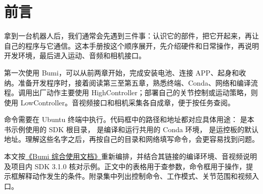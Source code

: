 \chapter*{前言}
拿到一台机器人后，我们通常会先遇到三件事：认识它的部件，把它开起来，再让自己的程序与它通信。这本手册按这个顺序展开，先介绍硬件和日常操作，再说明开发环境，最后进入运动、音频和相机接口。

第一次使用 Bumi，可以从前两章开始，完成安装电池、连接 APP、起身和收纳。准备开发程序时，接着阅读第三至第五章，熟悉终端、Conda、网络和编译流程。调用出厂动作主要使用 HighController；部署自己的关节控制或运动策略，则使用 LowController。音视频接口和相机采集各自成章，便于按任务查阅。

命令需要在 Ubuntu 终端中执行。代码框中的路径和地址都对应具体用途： 是本书示例使用的 SDK 根目录， 是编译和运行共用的 Conda 环境， 是运控板的默认地址。理解这些名字之后，再按自己的目录和网络填写命令，会更容易找到问题。

本文按\href{https://noetixrobotics.feishu.cn/docx/As2adPO27odPBfxQw1ucK6N4nNe}{《Bumi 综合使用文档》}重新编排，并结合其链接的编译环境、音视频说明及项目内 SDK 3.1.0 核对示例。正文中的表格用于查参数，命令框用于操作，提示框解释动作发生的条件。附录集中列出控制命令、工作模式、关节范围和视频入口。
